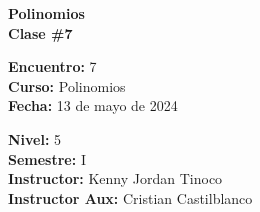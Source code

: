 \begin{center} \textbf
{
    \Large Polinomios \\ \vspace{2mm}Clase \#7
}
\end{center}

\begin{multicols}{2}
{
    \textbf{Encuentro:} 7\\
    \textbf{Curso:} Polinomios\\
    \textbf{Fecha:} 13 de mayo de 2024\\
    \begin{flushright}
        \textbf{Nivel:} 5\\
        \textbf{Semestre:} I\\
        \textbf{Instructor:} Kenny Jordan Tinoco\\
        \textbf{Instructor Aux:} Cristian Castilblanco
    \end{flushright}
}
\end{multicols}

\thispagestyle{first-page-style}